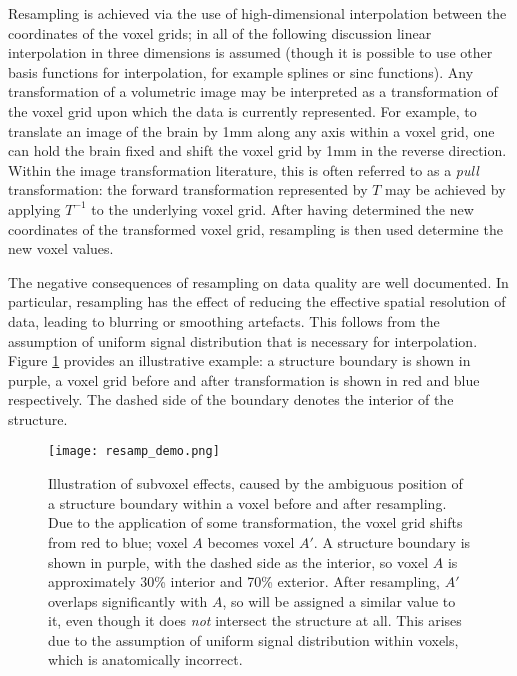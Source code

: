 Resampling is achieved via the use of high-dimensional interpolation between the coordinates of the voxel grids; in all of the following discussion linear interpolation in three dimensions is assumed (though it is possible to use other basis functions for interpolation, for example splines or sinc functions). Any transformation of a volumetric image may be interpreted as a transformation of the voxel grid upon which the data is currently represented. For example, to translate an image of the brain by 1mm along any axis within a voxel grid, one can hold the brain fixed and shift the voxel grid by 1mm in the reverse direction. Within the image transformation literature, this is often referred to as a \textit{pull} transformation: the forward transformation represented by $T$ may be achieved by applying $T^{-1}$ to the underlying voxel grid. After having determined the new coordinates of the transformed voxel grid, resampling is then used determine the new voxel values. 

The negative consequences of resampling on data quality are well documented. In particular, resampling has the effect of reducing the effective spatial resolution of data, leading to blurring or smoothing artefacts. This follows from the assumption of uniform signal distribution that is necessary for interpolation. Figure \ref{resamp_demo} provides an illustrative example: a structure boundary is shown in purple, a voxel grid before and after transformation is shown in red and blue respectively. The dashed side of the boundary denotes the interior of the structure. 

\begin{figure}
\centering
\texttt{[image: resamp\_demo.png]}
\caption{Illustration of subvoxel effects, caused by the ambiguous position of a structure boundary within a voxel before and after resampling. Due to the application of some transformation, the voxel grid shifts from red to blue; voxel $A$ becomes voxel $A'$. A structure boundary is shown in purple, with the dashed side as the interior, so voxel $A$ is approximately 30\% interior and 70\% exterior. After resampling, $A'$ overlaps significantly with $A$, so will be assigned a similar value to it, even though it does \textit{not} intersect the structure at all. This arises due to the assumption of uniform signal distribution within voxels, which is anatomically incorrect.}
\label{resamp_demo}
\end{figure}

